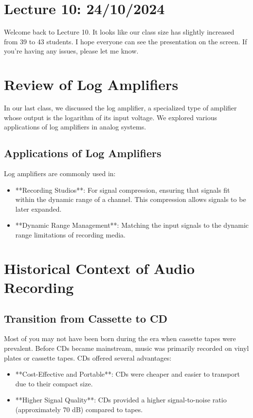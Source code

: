 
\section{Lecture 10: 24/10/2024}

Welcome back to Lecture 10. It looks like our class size has slightly increased from 39 to 43 students. I hope everyone can see the presentation on the screen. If you're having any issues, please let me know.

\section{Review of Log Amplifiers}

In our last class, we discussed the log amplifier, a specialized type of amplifier whose output is the logarithm of its input voltage. We explored various applications of log amplifiers in analog systems.

\subsection{Applications of Log Amplifiers}

Log amplifiers are commonly used in:
\begin{itemize}
    \item **Recording Studios**: For signal compression, ensuring that signals fit within the dynamic range of a channel. This compression allows signals to be later expanded.
    \item **Dynamic Range Management**: Matching the input signals to the dynamic range limitations of recording media.
\end{itemize}

\section{Historical Context of Audio Recording}

\subsection{Transition from Cassette to CD}

Most of you may not have been born during the era when cassette tapes were prevalent. Before CDs became mainstream, music was primarily recorded on vinyl plates or cassette tapes. CDs offered several advantages:
\begin{itemize}
    \item **Cost-Effective and Portable**: CDs were cheaper and easier to transport due to their compact size.
    \item **Higher Signal Quality**: CDs provided a higher signal-to-noise ratio (approximately 70 dB) compared to tapes.
\end{itemize}

